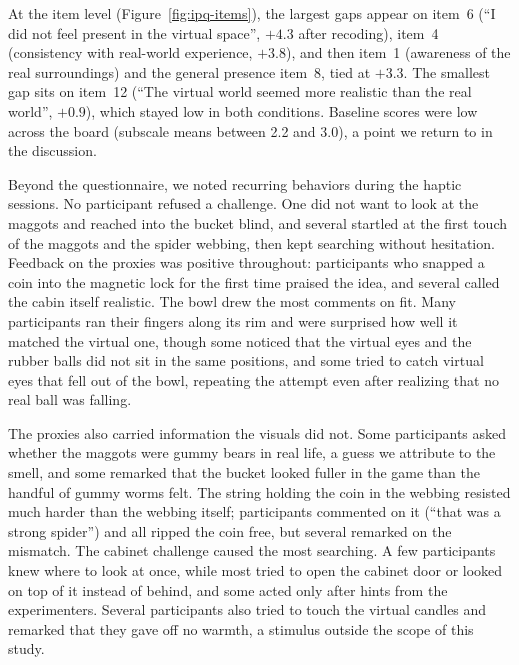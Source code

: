 At the item level (Figure~\ref{fig:ipq-items}), the largest gaps appear on item~6 (``I did not feel present in the virtual space'', $+4.3$ after recoding), item~4 (consistency with real-world experience, $+3.8$), and then item~1 (awareness of the real surroundings) and the general presence item~8, tied at $+3.3$.
 The smallest gap sits on item~12 (``The virtual world seemed more realistic than the real world'', $+0.9$), which stayed low in both conditions. Baseline scores were low across the board (subscale means between 2.2 and 3.0), a point we return to in the discussion.

Beyond the questionnaire, we noted recurring behaviors during the haptic sessions. No participant refused a challenge. One did not want to look at the maggots and reached into the bucket blind, and several startled at the first touch of the maggots and the spider webbing, then kept searching without hesitation. Feedback on the proxies was positive throughout: participants who snapped a coin into the magnetic lock for the first time praised the idea, and several called the cabin itself realistic. The bowl drew the most comments on fit. Many participants ran their fingers along its rim and were surprised how well it matched the virtual one, though some noticed that the virtual eyes and the rubber balls did not sit in the same positions, and some tried to catch virtual eyes that fell out of the bowl, repeating the attempt even after realizing that no real ball was falling.

The proxies also carried information the visuals did not. Some participants asked whether the maggots were gummy bears in real life, a guess we attribute to the smell, and some remarked that the bucket looked fuller in the game than the handful of gummy worms felt. The string holding the coin in the webbing resisted much harder than the webbing itself; participants commented on it (``that was a strong spider'') and all ripped the coin free, but several remarked on the mismatch. The cabinet challenge caused the most searching. A few participants knew where to look at once, while most tried to open the cabinet door or looked on top of it instead of behind, and some acted only after hints from the experimenters. Several participants also tried to touch the virtual candles and remarked that they gave off no warmth, a stimulus outside the scope of this study.
